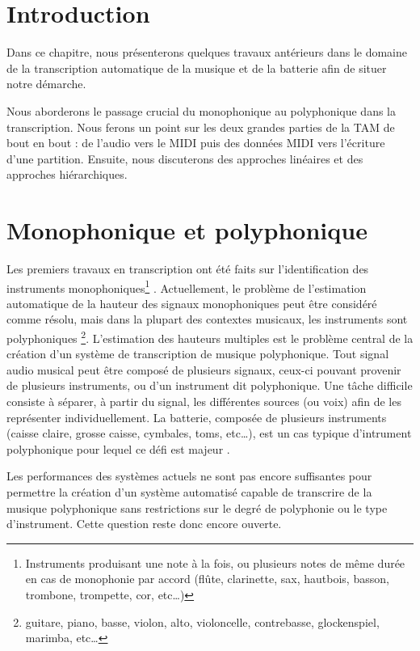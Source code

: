 \section*{Introduction}
Dans ce chapitre, nous présenterons quelques travaux antérieurs dans le domaine
de la transcription automatique de la musique et de la batterie afin de situer
notre démarche.

Nous aborderons le passage crucial du monophonique au polyphonique dans la
transcription. Nous ferons un point sur les deux grandes parties de la TAM de
bout en bout : de l’audio vers le MIDI puis des données MIDI vers l’écriture
d’une partition. Ensuite, nous discuterons des approches linéaires et des
approches hiérarchiques.

\section{Monophonique et polyphonique}
Les premiers travaux en transcription ont été faits sur l’identification des
instruments monophoniques\footnote{Instruments produisant une note à la fois,
ou plusieurs notes de même durée en cas de monophonie par accord (flûte,
clarinette, sax, hautbois, basson, trombone, trompette, cor, etc…)}
\cite{future_directions}. Actuellement, le problème de l'estimation automatique
de la hauteur des signaux monophoniques peut être considéré comme résolu, mais
dans la plupart des contextes musicaux, les instruments sont polyphoniques
\footnote{guitare, piano, basse, violon, alto, violoncelle, contrebasse,
glockenspiel, marimba, etc…}. L'estimation des hauteurs multiples est le
problème central de la création d'un système de transcription de musique
polyphonique. Tout signal audio musical peut être composé de plusieurs signaux,
ceux-ci pouvant provenir de plusieurs instruments, ou d'un instrument dit
polyphonique. Une tâche difficile consiste à séparer, à partir du signal, les
différentes sources (ou voix) afin de les représenter individuellement. La
batterie, composée de plusieurs instruments (caisse claire, grosse caisse,
cymbales, toms, etc…), est un cas typique d'intrument polyphonique pour lequel
ce défi est majeur .

Les performances des systèmes actuels ne sont pas encore suffisantes pour
permettre la création d'un système automatisé capable de transcrire de la
musique polyphonique sans restrictions sur le degré de polyphonie ou le type
d'instrument. Cette question reste donc encore ouverte.

